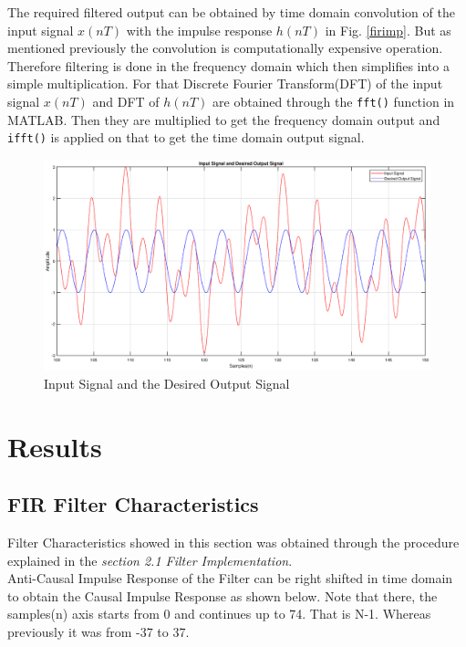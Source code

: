\documentclass[a4paper,11pt]{article}%
\begin{document}
The required filtered output can be obtained by time domain convolution of the input signal $x(nT)$ with the impulse response $h(nT)$ in Fig. \ref{firimp}. But as mentioned previously the convolution is computationally expensive operation. Therefore filtering is done in the frequency domain which then simplifies into a simple multiplication. For that Discrete Fourier Transform(DFT) of the input signal $x(nT)$ and DFT of $h(nT)$ are obtained through the {\tt fft()} function in MATLAB. Then they are multiplied to get the frequency domain output and {\tt ifft()} is applied on that to get the time domain output signal.
 
\begin{figure}[!h]
	\centering
	\includegraphics[scale=0.4]{figures/in-signal}
	\caption{Input Signal and the Desired Output Signal}
\end{figure}

\pagebreak
\section{Results}

\subsection{FIR Filter Characteristics}

Filter Characteristics showed in this section was obtained through the procedure explained in the \textit{section 2.1 Filter Implementation}.\\

Anti-Causal Impulse Response of the Filter can be right shifted in time domain to obtain the Causal Impulse Response as shown below. Note that there, the samples(n) axis starts from 0 and continues up to 74. That is N-1. Whereas previously it was from -37 to 37.
\end{document}
